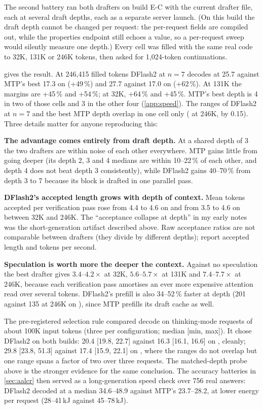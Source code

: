 The second battery ran both drafters on build E-C with the current drafter file, each at several draft
depths, each as a separate server launch. (On this build the draft depth cannot be changed per
request: the per-request fields are compiled out, while the properties endpoint still echoes a value,
so a per-request sweep would silently measure one depth.) Every cell was filled with the same real
code to 32K, 131K or 246K tokens, then asked for 1{,}024-token continuations.

 gives the result. At 246{,}415 filled tokens DFlash2 at $n{=}7$ decodes at 25.7
against MTP's best 17.3\tps{} on \Qsix{} (+49\,\%) and 27.7 against 17.0 on \Qfour{} (+62\,\%). At
131K the margins are +45\,\% and +54\,\%; at 32K, +64\,\% and +45\,\%. MTP's best depth is 4 in two of those cells and 3 in the other four (\cref{app:speed}). The ranges of
DFlash2 at $n{=}7$ and the best MTP depth overlap in one cell only (\Qsix{} at 246K, by 0.15\tps).
Three details matter for anyone reproducing this:

\textbf{The advantage comes entirely from draft depth.} At a shared depth of 3 the two drafters are
within noise of each other everywhere. MTP gains little from going deeper (its depth 2, 3 and 4
medians are within 10--22\,\% of each other, and depth 4 does not beat depth 3 consistently), while DFlash2 gains 40--70\,\% from depth 3 to 7 because
its block is drafted in one parallel pass.

\textbf{DFlash2's accepted length grows with depth of context.} Mean tokens accepted per verification
pass rose from 4.4 to 4.6 on \Qsix{} and from 3.5 to 4.6 on \Qfour{} between 32K and 246K. The
``acceptance collapse at depth'' in my early notes was the short-generation artifact described above.
Raw acceptance ratios are not comparable between drafters (they divide by different depths); report
accepted length and tokens per second.

\textbf{Speculation is worth more the deeper the context.} Against no speculation the best drafter
gives $3.4$--$4.2\times$ at 32K, $5.6$--$5.7\times$ at 131K and $7.4$--$7.7\times$ at 246K, because
each verification pass amortises an ever more expensive attention read over several tokens. DFlash2's
prefill is also 34--52\,\% faster at depth (201 against 135\tps{} at 246K on \Qsix), since MTP
prefills its draft cache as well.

The pre-registered selection rule compared decode on thinking-mode requests of about 100K input tokens
(three per configuration; median [min, max]). It chose DFlash2 on both builds: 20.4 [19.8, 22.7]
against 16.3 [16.1, 16.6]\tps{} on \Qsix, cleanly; 29.8 [23.8, 51.3] against 17.4 [15.9, 22.1] on
\Qfour, where the ranges do not overlap but one range spans a factor of two over three requests. The matched-depth probe above is the stronger evidence for the same conclusion. The
accuracy batteries in \cref{sec:aalcr} then served as a long-generation speed check over 756 real
answers: DFlash2 decoded at a median 34.6--48.9\tps{} against MTP's 23.7--28.2, at lower energy per
request (28--41\,kJ against 45--78\,kJ).

